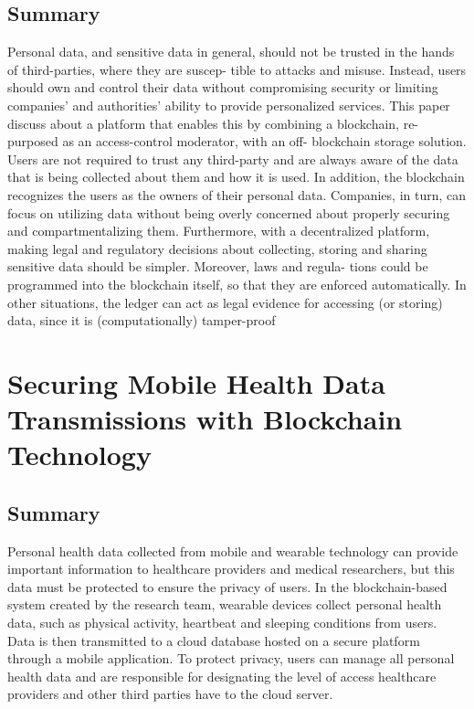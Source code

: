 \documentclass[11pt]{report}
\begin{document}
\subsection{Summary}
Personal data, and sensitive data in general, should not be
trusted in the hands of third-parties, where they are suscep-
tible to attacks and misuse. Instead, users should own and
control their data without compromising security or limiting
companies’ and authorities’ ability to provide personalized
services. This paper discuss about a platform that  enables this by combining a blockchain,
re-purposed as an access-control moderator, with an off-
blockchain storage solution. Users are not required to trust
any third-party and are always aware of the data that is
being collected about them and how it is used. In addition,
the blockchain recognizes the users as the owners of their
personal data. Companies, in turn, can focus on utilizing data
without being overly concerned about properly securing and
compartmentalizing them.
Furthermore, with a decentralized platform, making legal
and regulatory decisions about collecting, storing and sharing
sensitive data should be simpler. Moreover, laws and regula-
tions could be programmed into the blockchain itself, so that
they are enforced automatically. In other situations, the ledger
can act as legal evidence for accessing (or storing) data, since
it is (computationally) tamper-proof


\section{Securing Mobile Health Data Transmissions with Blockchain Technology\cite{5}}

\subsection{Summary}
Personal health data collected from mobile and wearable technology can provide important information to healthcare providers and medical researchers, but this data must be protected to ensure the privacy of users.
In the blockchain-based system created by the research team, wearable devices collect personal health data, such as physical activity, heartbeat and sleeping conditions from users. Data is then transmitted to a cloud database hosted on a secure platform through a mobile application. To protect privacy, users can manage all personal health data and are responsible for designating the level of access healthcare providers and other third parties have to the cloud server.\par
\end{document}
